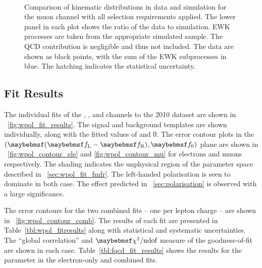 \begin{figure}[h!]
\centering
{}
\\
\caption[Comparison of kinematic distributions in data and simulation for the
  muon channel]{Comparison of kinematic distributions in data and simulation for the
  muon channel with all selection requirements applied. The lower panel in each
  plot shows the ratio of the data to simulation. \ac{EWK} processes are taken
  from the appropriate simulated sample. The \ac{QCD} contribution is negligible
  and thus not included. The data are shown as black points, with the sum of the
  \ac{EWK} subprocesses in blue. The hatching indicates the statistical
  uncertainty.}
\label{fig:wpol_datamc_mu}
\end{figure}

\subsection{Fit Results}
The individual fits of the \Pep, \Pem, \Pgmp and \Pgmm channels to the 2010
dataset are shown in \fig~\ref{fig:wpol_fit_results}. The signal and background
templates are shown individually, along with the fitted values of \fLmfR and
\f0. The error contour plots in the $(\fLmfR, \f0)$ plane are shown in
\figs~\ref{fig:wpol_contour_ele} and \ref{fig:wpol_contour_mu} for electrons and
muons respectively. The shading indicates the unphysical region of the parameter
space described in \sec~\ref{sec:wpol_fit_fmfr}. The left-handed polarisation is
seen to dominate in both case. The effect predicted in
\sec~\ref{sec:polarisation} is observed with a large significance.

The error contours for the two combined fits -- one per lepton charge -- are
shown in \fig~\ref{fig:wpol_contour_comb}. The results of each fit are presented
in Table~\ref{tbl:wpol_fitresults} along with statistical and systematic
uncertainties. The ``global correlation'' and $\chisq/\textrm{ndof}$ measure of
the goodness-of-fit are shown in each case. Table~\ref{tbl:fqcd_fit_results}
shows the results for the parameter \fQCD in the electron-only and combined
fits.

